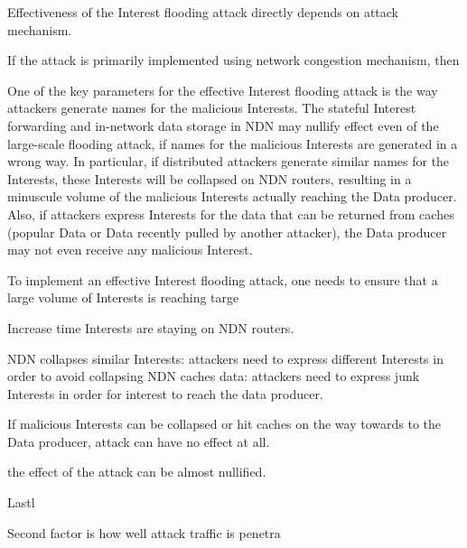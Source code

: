 Effectiveness of the Interest flooding attack directly depends on attack mechanism.

If the attack is primarily implemented using network congestion mechanism, then 

One of the key parameters for the effective Interest flooding attack is the way attackers generate names for the malicious Interests.
The stateful Interest forwarding and in-network data storage in NDN may nullify effect even of the large-scale flooding attack, if names for the malicious Interests are generated in a wrong way.
In particular, if distributed attackers generate similar names for the Interests, these Interests will be collapsed on NDN routers, resulting in a minuscule volume of the malicious Interests actually reaching the Data producer.
Also, if attackers express Interests for the data that can be returned from caches (popular Data or Data recently pulled by another attacker), the Data producer may not even receive any malicious Interest.


To implement an effective Interest flooding attack, one needs to ensure that a large volume of Interests is reaching targe 

Increase time Interests are staying on NDN routers.



NDN collapses similar Interests: attackers need to express different Interests in order to avoid collapsing
NDN caches data: attackers need to express junk Interests in order for interest to reach the data producer.



If malicious Interests can be collapsed or hit caches on the way towards to the Data producer, attack can have no effect at all.


the effect of the attack can be almost nullified. 

Lastl


Second factor is how well attack traffic is penetra

%



